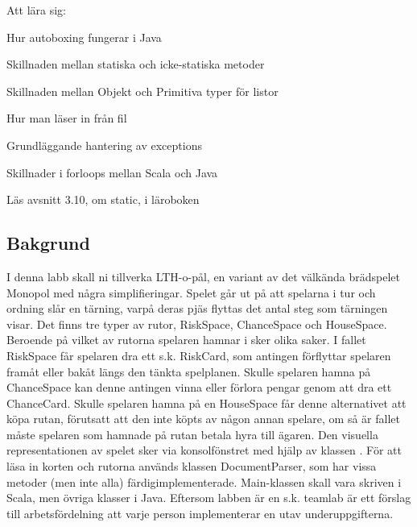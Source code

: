 

\Lab{\LabWeekELEVEN}

\begin{Goals}
Att lära sig:
\item Hur autoboxing fungerar i Java
\item Skillnaden mellan statiska och icke-statiska metoder
\item Skillnaden mellan Objekt och Primitiva typer för listor
\item Hur man läser in från fil
\item Grundläggande hantering av exceptions
\item Skillnader i forloops mellan Scala och Java

\end{Goals}

\begin{Preparations}
\item Läs avsnitt 3.10, om static, i läroboken
\end{Preparations}
\subsection{Bakgrund}
I denna labb skall ni tillverka LTH-o-pål, en variant av det välkända brädspelet Monopol med några simplifieringar. Spelet går ut på att spelarna i tur och ordning slår en tärning, varpå deras pjäs flyttas det antal steg som tärningen visar. Det finns tre typer av rutor, RiskSpace, ChanceSpace och HouseSpace. Beroende på vilket av rutorna spelaren hamnar i sker olika saker. I fallet RiskSpace får spelaren dra ett s.k. RiskCard, som antingen förflyttar spelaren framåt eller bakåt längs den tänkta spelplanen. Skulle spelaren hamna på ChanceSpace kan denne antingen vinna eller förlora pengar genom att dra ett ChanceCard. Skulle spelaren hamna på en HouseSpace får denne alternativet att köpa rutan, förutsatt att den inte köpts av någon annan spelare, om så är fallet måste spelaren som hamnade på rutan betala hyra till ägaren.
Den visuella representationen av spelet sker via konsolfönstret med hjälp av klassen . 
För att läsa in korten och rutorna används klassen DocumentParser, som har vissa metoder (men inte alla) färdigimplementerade.
Main-klassen skall vara skriven i Scala, men övriga klasser i Java. 
Eftersom labben är en s.k. teamlab är ett förslag till arbetsfördelning att varje person implementerar en utav underuppgifterna.

